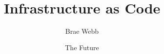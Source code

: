 \documentclass{csse4400}
\title{Infrastructure as Code}
\author{Brae Webb}
\date{{\color{red} The Future}}
\begin{document}
\makecover





\end{document}
